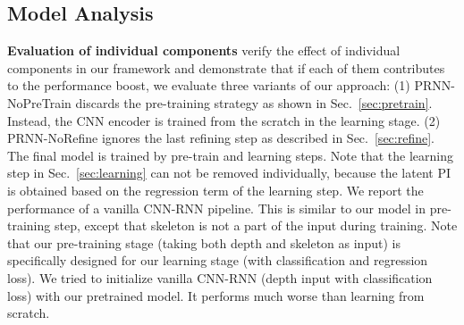 \documentclass[10pt,twocolumn,letterpaper]{article}
\begin{document}
\begin{table}[t]
\setlength{\tabcolsep}{0.4em}
\centering
\footnotesize
{}
\caption{Contribution of each model component}
\label{tab:indiv}
\end{table}

\vspace{-0.1cm}
\subsection{Model Analysis}

\noindent \textbf{Evaluation of individual components} \To verify the effect of individual components in our framework and demonstrate that if each of them contributes to the performance boost, we evaluate three variants of our approach: (1) PRNN-NoPreTrain discards the pre-training strategy as shown in Sec.~\ref{sec:pretrain}. Instead, the CNN encoder is trained from the scratch in the learning stage. (2) PRNN-NoRefine ignores the last refining step as described in Sec.~\ref{sec:refine}. The final model is trained by pre-train and learning steps. Note that the learning step in Sec.~\ref{sec:learning} can not be removed individually, because the latent PI is obtained based on the regression term of the learning step. We report the performance of a vanilla CNN-RNN pipeline. This is similar to our model in pre-training step, except that skeleton is not a part of the input during training. Note that our pre-training stage (taking both depth and skeleton as input) is specifically designed for our learning stage (with classification and regression loss). We tried to initialize vanilla CNN-RNN (depth input with classification loss) with our pretrained model. It performs much worse than learning from scratch. 
\end{document}

